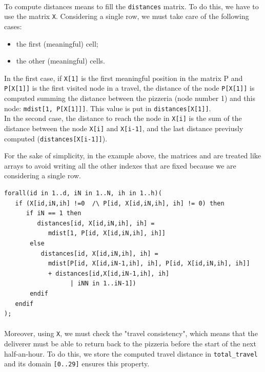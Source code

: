 \documentclass[10pt]{article}
\begin{document}
	\paragraph*{}
	To compute distances means to fill the \texttt{distances} matrix.
    To do this, we have to use the matrix \texttt{X}. 
	Considering a single row, we must take care of the following cases:
	\begin{itemize}
		\item the first (meaningful) cell;
		\item the other (meaningful) cells.
	\end{itemize}
	
	
	In the first case, if \texttt{X[1]} is the first meaningful position in the 
	matrix P and \texttt{P[X[1]]} is the first visited node in a travel,
	the distance of the node \texttt{P[X[1]]} is computed summing the 
	distance between the pizzeria (node number 1) and this node: \texttt{mdist[1, P[X[1]]]}.
	This value is put in \texttt{distances[X[1]]}.\\
	
	In the second case, the distance to reach the node in \texttt{X[i]} is 
	the sum of the distance between the node \texttt{X[i]} and \texttt{X[i-1]}, and the last 
	distance previusly computed (\texttt{distances[X[i-1]]}). 
	
	For the sake of simplicity, in the example above, the matrices  and  are treated 
	like arrays to avoid writing all the other indexes that are fixed because we are considering a single 
	row.

	
	\begin{verbatim}
forall(id in 1..d, iN in 1..N, ih in 1..h)(
   if (X[id,iN,ih] !=0  /\ P[id, X[id,iN,ih], ih] != 0) then
      if iN == 1 then
         distances[id, X[id,iN,ih], ih] = 
            mdist[1, P[id, X[id,iN,ih], ih]] 
       else
          distances[id, X[id,iN,ih], ih] = 
            mdist[P[id, X[id,iN-1,ih], ih], P[id, X[id,iN,ih], ih]] 
         	+ distances[id,X[id,iN-1,ih], ih]
                  | iNN in 1..iN-1])
       endif
   endif
);
	\end{verbatim}

	\paragraph*{}
	Moreover, using \texttt{X}, we must check the "travel consistency", which 
	means that the deliverer must be able to return back to the pizzeria before the 
	start of the next half-an-hour. 
	To do this, we store the computed travel distance in \texttt{total\_travel} and its 
	domain \texttt{[0..29]} ensures this property.  
\end{document}
